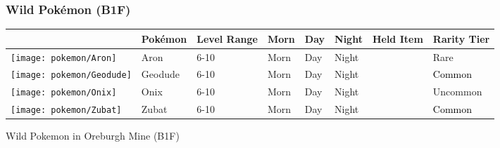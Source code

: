 \subsubsection{Wild Pokémon (B1F)}%
\label{ssubsec:WildPokmon(B1F)}%
\begin{longtable}{||l l l l l l l l||}%
\hline%
\rowcolor{gray}%
&Pokémon&Level Range&Morn&Day&Night&Held Item&Rarity Tier\\%
\hline%
\endhead%
\hline%
\rowcolor{gray}%
\texttt{[image: pokemon/Aron]}&Aron&6{-}10&Morn&Day&Night&&\textcolor{RedOrange}{%
Rare%
}\\%
\hline%
\rowcolor{gray}%
\texttt{[image: pokemon/Geodude]}&Geodude&6{-}10&Morn&Day&Night&&\textcolor{black}{%
Common%
}\\%
\hline%
\rowcolor{gray}%
\texttt{[image: pokemon/Onix]}&Onix&6{-}10&Morn&Day&Night&&\textcolor{OliveGreen}{%
Uncommon%
}\\%
\hline%
\rowcolor{gray}%
\texttt{[image: pokemon/Zubat]}&Zubat&6{-}10&Morn&Day&Night&&\textcolor{black}{%
Common%
}\\%
\hline%
\end{longtable}%
\caption{Wild Pokemon in Oreburgh Mine (B1F)}